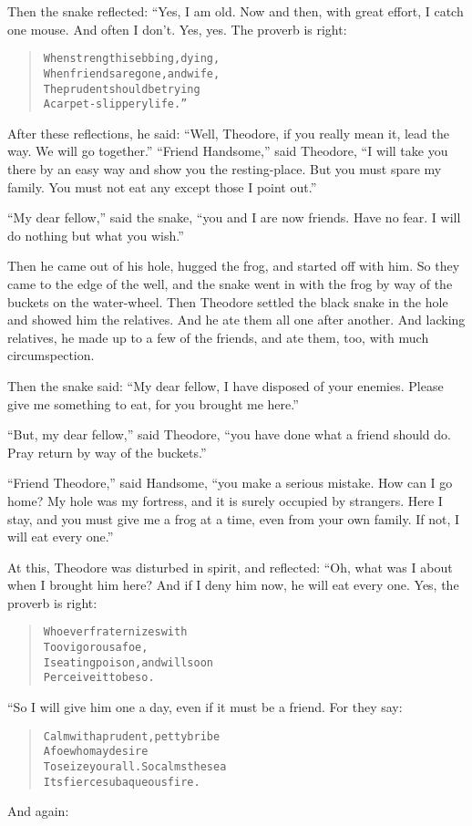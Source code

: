 \documentclass[article, twoside, 14pt]{memoir}
\renewenvironment{verbatim}{%
\begin{quote}%
\vskip -10pt%
\begin{alltt}\normalfont\large}{\end{alltt}%
\end{quote}%
\vskip -10pt
} %
\begin{document}
Then the snake reflected: “Yes, I am old. Now and then, with great
effort, I catch one mouse. And often I don't. Yes, yes. The proverb
is right:

\begin{verbatim}
When strength is ebbing, dying,
    When friends are gone, and wife,
The prudent should be trying
    A carpet-slippery life.”
\end{verbatim}
After these reflections, he said:
``Well, Theodore, if you really mean it, lead the way. We will go together.''
``Friend Handsome,'' said Theodore,
``I will take you there by an easy way and show you the resting-place. But you must spare my family. You must not eat any except those I point out.''

``My dear fellow,'' said the snake,
``you and I are now friends. Have no fear. I will do nothing but what you wish.''

Then he came out of his hole, hugged the frog, and started off with
him. So they came to the edge of the well, and the snake went in
with the frog by way of the buckets on the water-wheel. Then
Theodore settled the black snake in the hole and showed him the
relatives. And he ate them all one after another. And lacking
relatives, he made up to a few of the friends, and ate them, too,
with much circumspection.

Then the snake said:
``My dear fellow, I have disposed of your enemies. Please give me something to eat, for you brought me here.''

``But, my dear fellow,'' said Theodore,
``you have done what a friend should do. Pray return by way of the buckets.''

``Friend Theodore,'' said Handsome,
``you make a serious mistake. How can I go home? My hole was my fortress, and it is surely occupied by strangers. Here I stay, and you must give me a frog at a time, even from your own family. If not, I will eat every one.''

At this, Theodore was disturbed in spirit, and reflected: “Oh, what
was I about when I brought him here? And if I deny him now, he will
eat every one. Yes, the proverb is right:

\begin{verbatim}
Whoever fraternizes with
    Too vigorous a foe,
Is eating poison, and will soon
    Perceive it to be so.
\end{verbatim}
“So I will give him one a day, even if it must be a friend. For
they say:

\begin{verbatim}
Calm with a prudent, petty bribe
    A foe who may desire
To seize your all. So calms the sea
    Its fierce subaqueous fire.
\end{verbatim}
And again:
\end{document}

